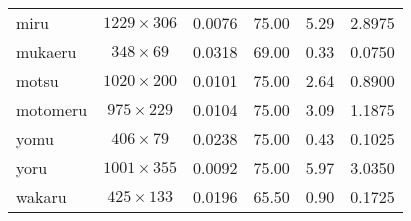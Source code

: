 \begin{table}[ht]
\begin{center}
\begin{tabular}{|p{}|c|c|c|c|c|}
miru & \( 1229 \times 306 \) & 0.0076    & 75.00 & 5.29   & 2.8975          \\
mukaeru & \( 348 \times 69 \) & 0.0318   & 69.00 & 0.33   & 0.0750       \\
motsu & \( 1020 \times 200 \) & 0.0101   & 75.00 & 2.64   & 0.8900         \\
motomeru & \( 975 \times 229 \) & 0.0104 & 75.00 & 3.09   & 1.1875      \\
yomu & \( 406 \times 79 \) & 0.0238      & 75.00 & 0.43   & 0.1025          \\
yoru & \( 1001 \times 355 \) & 0.0092    & 75.00 & 5.97   & 3.0350          \\
wakaru & \( 425 \times 133 \) & 0.0196   & 65.50 & 0.90   & 0.1725       \\ \hline
    \end{tabular} \label{jigen-com1}
  \end{center}
\end{table}

